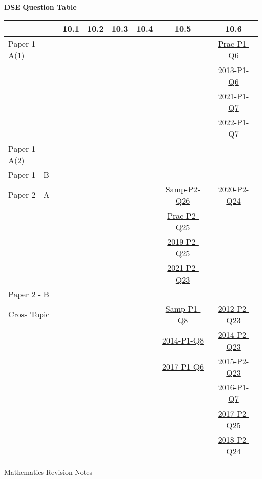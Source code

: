 \documentclass[12pt, a4paper]{article}
\begin{document}
\begin{absolutelynopagebreak}
\begin{center}
\textbf{DSE Question Table}
\end{center}
\begin{center}
\begin{tabular}{|l|c|c|c|c|c|c|}
\hline
        & 10.1 & 10.2 & 10.3 & 10.4 & 10.5 & 10.6 \\\hline
\hline
Paper 1 - A(1)&  &  &  &  &  & \hyperref[DSE2012P-CoreP1-Q06]{Prac-P1-Q6} \\
&  &  &  &  &  & \hyperref[DSE2013-CoreP1-Q06]{2013-P1-Q6} \\
&  &  &  &  &  & \hyperref[DSE2021-CoreP1-Q07]{2021-P1-Q7} \\
&  &  &  &  &  & \hyperref[DSE2022-CoreP1-Q07]{2022-P1-Q7} \\
\hline
Paper 1 - A(2)&  &  &  &  &  &  \\
\hline
Paper 1 - B&  &  &  &  &  &  \\
\hline
\hline
Paper 2 - A&  &  &  &  & \hyperref[DSE2012S-CoreP2-Q26]{Samp-P2-Q26} & \hyperref[DSE2020-CoreP2-Q24]{2020-P2-Q24} \\
&  &  &  &  & \hyperref[DSE2012P-CoreP2-Q25]{Prac-P2-Q25} &  \\
&  &  &  &  & \hyperref[DSE2019-CoreP2-Q25]{2019-P2-Q25} &  \\
&  &  &  &  & \hyperref[DSE2021-CoreP2-Q23]{2021-P2-Q23} &  \\
\hline
Paper 2 - B&  &  &  &  &  &  \\
\hline
\hline
Cross Topic&  &  &  &  & \hyperref[DSE2012S-CoreP1-Q08]{Samp-P1-Q8} & \hyperref[DSE2012-CoreP2-Q23]{2012-P2-Q23} \\
&  &  &  &  & \hyperref[DSE2014-CoreP1-Q08]{2014-P1-Q8} & \hyperref[DSE2014-CoreP2-Q23]{2014-P2-Q23} \\
&  &  &  &  & \hyperref[DSE2017-CoreP1-Q06]{2017-P1-Q6} & \hyperref[DSE2015-CoreP2-Q23]{2015-P2-Q23} \\
&  &  &  &  &  & \hyperref[DSE2016-CoreP1-Q07]{2016-P1-Q7} \\
&  &  &  &  &  & \hyperref[DSE2017-CoreP2-Q25]{2017-P2-Q25} \\
&  &  &  &  &  & \hyperref[DSE2018-CoreP2-Q24]{2018-P2-Q24} \\
\hline
\end{tabular}
\end{center}
\end{absolutelynopagebreak}
\newpage
\newpage
\thispagestyle{empty}
\begin{center}
Mathematics Revision Notes\\\vspace{1cm}
\\\vspace{1cm}
{\fontsize{24pt}{24pt}\selectfont {Angles related to Lines}} \\\vspace{1cm}
\label{chapter:S1-11}

\end{center}
\vspace{0.5cm}
\hline
\end{document}

